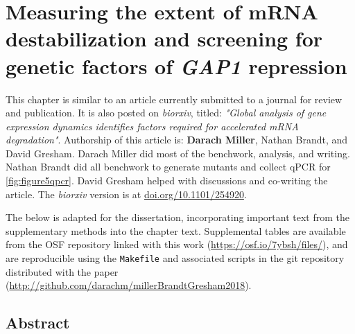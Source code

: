 \chapter{Measuring the extent of mRNA destabilization and screening 
for genetic factors of \textit{GAP1} repression}

This chapter is similar to an article currently submitted to a 
journal for review and publication. 
It is also posted on \textit{biorxiv}, titled:
\textit{"Global analysis of gene expression dynamics identifies factors
required for accelerated mRNA degradation"}.
Authorship of this article is: \textbf{Darach Miller}, Nathan Brandt, 
and David Gresham.
Darach Miller did most of the benchwork, analysis, and writing.
Nathan Brandt did all benchwork to generate mutants and collect qPCR 
for \autoref{fig:figure5qpcr}.
David Gresham helped with discussions and co-writing the article.
The \textit{biorxiv} version is at \url{doi.org/10.1101/254920}.

The below is adapted for the dissertation, incorporating important
text from the supplementary methods into the chapter text.
Supplemental tables are available from the OSF repository linked 
with this work (\url{https://osf.io/7ybsh/files/}), 
and are reproducible
using the \texttt{Makefile} and associated scripts
in the git repository distributed with the paper
(\url{http://github.com/darachm/millerBrandtGresham2018}).


\section{Abstract}

